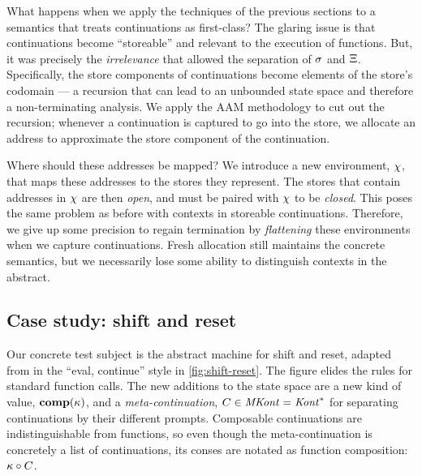 What happens when we apply the techniques of the previous sections to a semantics that treats continuations as first-class?
%
The glaring issue is that continuations become ``storeable'' and relevant to the execution of functions.
%
But, it was precisely the \emph{irrelevance} that allowed the separation of $\sigma$ and $\Xi$.
%
Specifically, the store components of continuations become elements of the store's codomain --- a recursion that can lead to an unbounded state space and therefore a non-terminating analysis.
%
We apply the AAM methodology to cut out the recursion; whenever a continuation is captured to go into the store, we allocate an address to approximate the store component of the continuation.

Where should these addresses be mapped?
%
We introduce a new environment, $\chi$, that maps these addresses to the stores they represent.
%
The stores that contain addresses in $\chi$ are then \emph{open}, and must be paired with $\chi$ to be \emph{closed}.
%
This poses the same problem as before with contexts in storeable continuations.
%
Therefore, we give up some precision to regain termination by \emph{flattening} these environments when we capture continuations.
%
Fresh allocation still maintains the concrete semantics, but we necessarily lose some ability to distinguish contexts in the abstract.

\subsection{Case study: shift and reset}
Our concrete test subject is the abstract machine for shift and reset, adapted from \citet{ianjohnson:Biernacki2006274} in the ``eval, continue'' style in \autoref{fig:shift-reset}.
%
The figure elides the rules for standard function calls.
%
The new additions to the state space are a new kind of value, $\mathbf{comp}(\kappa)$, and a \emph{meta-continuation}, $C \in \mathit{MKont} = \mathit{Kont}^*$ for separating continuations by their different prompts.
%
Composable continuations are indistinguishable from functions, so even though the meta-continuation is concretely a list of continuations, its conses are notated as function composition: $\kappa\circ C$.


